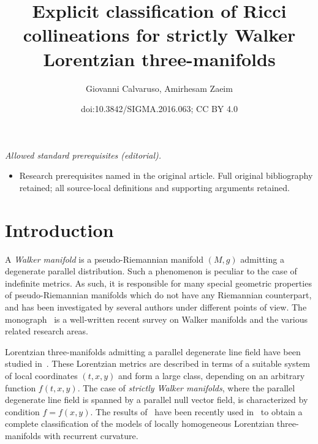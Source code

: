 \documentclass[10pt,a4paper]{amsart}
\title{Explicit classification of Ricci collineations for strictly Walker Lorentzian three-manifolds}
\author{Giovanni Calvaruso, Amirhesam Zaeim}
\date{doi:10.3842/SIGMA.2016.063; CC BY 4.0}
\numberwithin{equation}{section}
\begin{document}
\maketitle
\noindent\textit{Allowed standard prerequisites (editorial).}\begin{itemize}
\item Research prerequisites named in the original article. Full original bibliography retained; all source-local definitions and supporting arguments retained.
\end{itemize}\medskip
\section{Introduction}

A {\em Walker manifold} is a pseudo-Riemannian manifold $(M,g)$ admitting a degenerate parallel distribution. Such a phenomenon is peculiar to the case of indef\/inite metrics. As such, it is responsible for many special geometric properties of pseudo-Riemannian manifolds which do not have any Riemannian counterpart, and has been investigated by several authors under dif\/ferent points of view. The monograph~\cite{bookW} is a well-written recent survey on Walker manifolds and the various related research areas.

Lorentzian three-manifolds admitting a parallel degenerate line f\/ield have been studied in~\cite{ChGRVA}. These Lorentzian metrics are described in terms of a suitable system of local coordinates $(t,x,y)$ and form a large class, depending on an arbitrary function $f(t,x,y)$. The case of {\em strictly Walker manifolds}, where the parallel degenerate line f\/ield is spanned by a parallel null vector f\/ield, is characterized by condition $f=f(x,y)$. The results of~\cite{ChGRVA} have been recently used in~\cite{GGN} to obtain a complete classif\/ication of the models of locally homogeneous Lorentzian three-manifolds with recurrent curvature.
\end{document}
